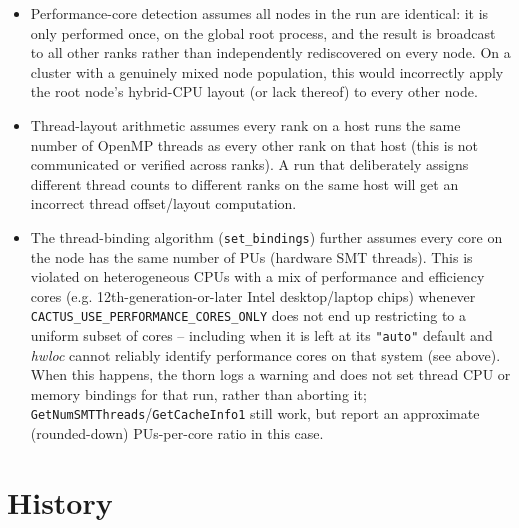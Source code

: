 \begin{itemize}
  What matters is the \emph{hwloc} this thorn was actually
  \emph{compiled} against, which can differ from the one a command-line
  tool like \texttt{lstopo} on the same machine uses (Cactus commonly
  vendors and builds its own copy of \emph{hwloc} rather than using the
  system's). A build against an \emph{hwloc} older than 2.4.0 disables
  performance-core detection entirely, regardless of what
  \texttt{lstopo --cpukinds} on that same machine can see; check which
  \texttt{hwloc.h} this thorn's build actually used (e.g. \texttt{HWLOC\_DIR}
  in your \texttt{OptionList}) and that header's \texttt{HWLOC\_API\_VERSION}
  if \texttt{CACTUS\_USE\_PERFORMANCE\_CORES\_ONLY=auto} silently does not
  restrict on a system you know is heterogeneous.
\item Performance-core detection assumes all nodes in the run are
  identical: it is only performed once, on the global root process,
  and the result is broadcast to all other ranks rather than
  independently rediscovered on every node. On a cluster with a
  genuinely mixed node population, this would incorrectly apply the
  root node's hybrid-CPU layout (or lack thereof) to every other node.
\item Thread-layout arithmetic assumes every rank on a host runs the
  same number of OpenMP threads as every other rank on that host (this
  is not communicated or verified across ranks). A run that
  deliberately assigns different thread counts to different ranks on
  the same host will get an incorrect thread offset/layout computation.
\item The thread-binding algorithm (\texttt{set\_bindings}) further
  assumes every core on the node has the same number of PUs (hardware
  SMT threads). This is violated on heterogeneous CPUs with a mix of
  performance and efficiency cores (e.g. 12th-generation-or-later Intel
  desktop/laptop chips) whenever
  \texttt{CACTUS\_USE\_PERFORMANCE\_CORES\_ONLY} does not end up
  restricting to a uniform subset of cores -- including when it is left
  at its \texttt{"auto"} default and \emph{hwloc} cannot reliably
  identify performance cores on that system (see above). When this
  happens, the thorn logs a warning and does not set thread CPU or
  memory bindings for that run, rather than aborting it;
  \texttt{GetNumSMTThreads}/\texttt{GetCacheInfo1} still work, but
  report an approximate (rounded-down) PUs-per-core ratio in this case.
\end{itemize}

\section{History}

